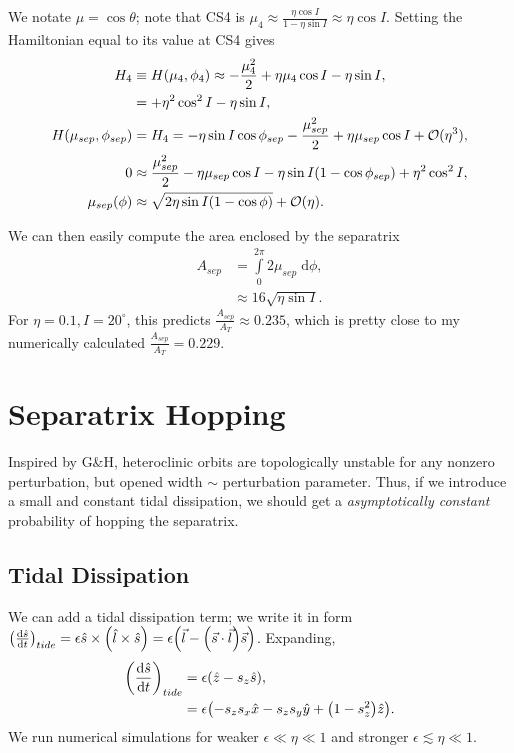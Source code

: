 \documentclass[11pt,
        usenames, %
        dvipsnames %
    ]{article}
\newcommand*{\rd}[2]{\frac{\mathrm{d}#1}{\mathrm{d}#2}}
\DeclarePairedDelimiter\p{\lparen}{\rparen}
\begin{document}
We notate $\mu = \cos\theta$; note that CS4 is $\mu_4 \approx \frac{\eta \cos
I}{1 - \eta \sin I} \approx \eta \cos I$. Setting the Hamiltonian equal to its
value at CS4 gives
\begin{align*}
    H_4 &\equiv H\p*{\mu_4, \phi_4}
        \approx -\frac{\mu_4^2}{2} + \eta \mu_4 \cos I - \eta \sin I,\\
        &= +\eta^2\cos^2 I - \eta \sin I,\\
    H(\mu_{sep}, \phi_{sep})
        &= H_4 = -\eta \sin I \cos \phi_{sep} - \frac{\mu_{sep}^2}{2} + \eta
            \mu_{sep} \cos I + \mathcal{O}(\eta^3),\\
    0 &\approx \frac{\mu_{sep}^2}{2} - \eta \mu_{sep} \cos I
        - \eta \sin I\p*{1 - \cos \phi_{sep}} + \eta^2\cos^2I,\\
    \mu_{sep}\p*{\phi} &\approx \sqrt{2\eta \sin I\p*{1 - \cos \phi}}
        + \mathcal{O}(\eta).
\end{align*}

We can then easily compute the area enclosed by the separatrix
\begin{align}
    A_{sep} &= \int\limits_0^{2\pi}2\mu_{sep}\;\mathrm{d}\phi,\nonumber\\
        &\approx 16\sqrt{\eta \sin I}.
\end{align}
For $\eta = 0.1, I = 20^\circ$, this predicts $\frac{A_{sep}}{A_{T}} \approx
0.235$, which is pretty close to my numerically calculated $\frac{A_{sep}}{A_T}
= 0.229$.

\section{Separatrix Hopping}

Inspired by G\&H, heteroclinic orbits are topologically unstable for any nonzero
perturbation, but opened width $\sim$ perturbation parameter. Thus, if we
introduce a small and constant tidal dissipation, we should get a
\emph{asymptotically constant} probability of hopping the separatrix.

\subsection{Tidal Dissipation}

We can add a tidal dissipation term; we write it in form
$\p*{\rd{\hat{s}}{t}}_{tide} = \epsilon \hat{s} \times \p*{\hat{l} \times
\hat{s}} = \epsilon\p*{\vec{l} - \p*{\vec{s} \cdot \vec{l}}\vec{s}}$. Expanding,
\begin{align}
    \p*{\rd{\hat{s}}{t}}_{tide} &= \epsilon \p*{\hat{z} - s_z\hat{s}}
        ,\nonumber\\
        &= \epsilon \p*{-s_z s_x\hat{x} - s_zs_y\hat{y} + \p*{1 - s_z^2}
            \hat{z}}.
\end{align}
We run numerical simulations for weaker $\epsilon \ll \eta \ll 1$ and stronger
$\epsilon \lesssim \eta \ll 1$.
\end{document}
